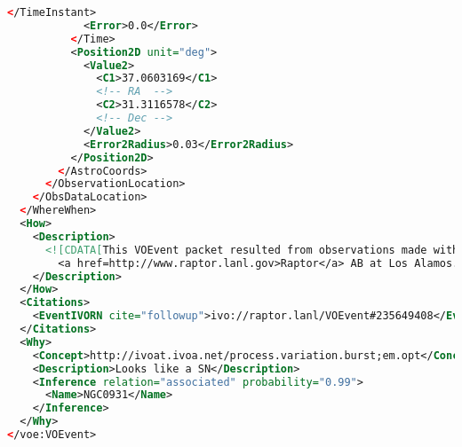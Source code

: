 \documentclass[11pt,a4paper]{ivoa}
\begin{document}
\begin{lstlisting}[language=XML]
            </TimeInstant>
            <Error>0.0</Error>
          </Time>
          <Position2D unit="deg">
            <Value2>
              <C1>37.0603169</C1>
              <!-- RA  -->
              <C2>31.3116578</C2>
              <!-- Dec -->
            </Value2>
            <Error2Radius>0.03</Error2Radius>
          </Position2D>
        </AstroCoords>
      </ObservationLocation>
    </ObsDataLocation>
  </WhereWhen>
  <How>
    <Description>
      <![CDATA[This VOEvent packet resulted from observations made with
        <a href=http://www.raptor.lanl.gov>Raptor</a> AB at Los Alamos. ]]>
    </Description>
  </How>
  <Citations>
    <EventIVORN cite="followup">ivo://raptor.lanl/VOEvent#235649408</EventIVORN>
  </Citations>
  <Why>
    <Concept>http://ivoat.ivoa.net/process.variation.burst;em.opt</Concept>
    <Description>Looks like a SN</Description>
    <Inference relation="associated" probability="0.99">
      <Name>NGC0931</Name>
    </Inference>
  </Why>
</voe:VOEvent>
\end{lstlisting}
\end{document}
